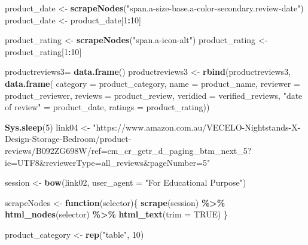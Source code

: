\documentclass[
]{article}
\newenvironment{Shaded}{\begin{snugshade}}{\end{snugshade}}
\newcommand{\AttributeTok}[1]{\textcolor[rgb]{0.13,0.29,0.53}{#1}}
\newcommand{\ConstantTok}[1]{\textcolor[rgb]{0.56,0.35,0.01}{#1}}
\newcommand{\ControlFlowTok}[1]{\textcolor[rgb]{0.13,0.29,0.53}{\textbf{#1}}}
\newcommand{\DecValTok}[1]{\textcolor[rgb]{0.00,0.00,0.81}{#1}}
\newcommand{\FunctionTok}[1]{\textcolor[rgb]{0.13,0.29,0.53}{\textbf{#1}}}
\newcommand{\NormalTok}[1]{#1}
\newcommand{\OtherTok}[1]{\textcolor[rgb]{0.56,0.35,0.01}{#1}}
\newcommand{\SpecialCharTok}[1]{\textcolor[rgb]{0.81,0.36,0.00}{\textbf{#1}}}
\newcommand{\StringTok}[1]{\textcolor[rgb]{0.31,0.60,0.02}{#1}}
\begin{document}
\begin{Shaded}
\begin{Highlighting}[]
\NormalTok{  product\_date }\OtherTok{\textless{}{-}} \FunctionTok{scrapeNodes}\NormalTok{(}\StringTok{"span.a{-}size{-}base.a{-}color{-}secondary.review{-}date"}\NormalTok{)}
\NormalTok{  product\_date }\OtherTok{\textless{}{-}}\NormalTok{ product\_date[}\DecValTok{1}\SpecialCharTok{:}\DecValTok{10}\NormalTok{]}
  
\NormalTok{  product\_rating }\OtherTok{\textless{}{-}} \FunctionTok{scrapeNodes}\NormalTok{(}\StringTok{"span.a{-}icon{-}alt"}\NormalTok{)}
\NormalTok{  product\_rating }\OtherTok{\textless{}{-}}\NormalTok{ product\_rating[}\DecValTok{1}\SpecialCharTok{:}\DecValTok{10}\NormalTok{]}
  
\NormalTok{  productreviews3}\OtherTok{=} \FunctionTok{data.frame}\NormalTok{()}
\NormalTok{  productreviews3 }\OtherTok{\textless{}{-}} \FunctionTok{rbind}\NormalTok{(productreviews3, }\FunctionTok{data.frame}\NormalTok{(}
                      \AttributeTok{category =}\NormalTok{ product\_category,}
                      \AttributeTok{name =}\NormalTok{ product\_name,}
                      \AttributeTok{reviewer =}\NormalTok{ product\_reviewer,}
                      \AttributeTok{reviews =}\NormalTok{ product\_review,}
                      \AttributeTok{veridied =}\NormalTok{ verified\_reviews,}
                      \StringTok{"date of review"} \OtherTok{=}\NormalTok{ product\_date,}
                      \AttributeTok{ratings =}\NormalTok{ product\_rating))}
  
   \FunctionTok{Sys.sleep}\NormalTok{(}\DecValTok{5}\NormalTok{)}
\NormalTok{link04 }\OtherTok{\textless{}{-}} \StringTok{"https://www.amazon.com.au/VECELO{-}Nightstands{-}X{-}Design{-}Storage{-}Bedroom/product{-}reviews/B092ZG698W/ref=cm\_cr\_getr\_d\_paging\_btm\_next\_5?ie=UTF8\&reviewerType=all\_reviews\&pageNumber=5"}


\NormalTok{  session }\OtherTok{\textless{}{-}} \FunctionTok{bow}\NormalTok{(link02,}
               \AttributeTok{user\_agent =} \StringTok{"For Educational Purpose"}\NormalTok{)}

\NormalTok{  scrapeNodes }\OtherTok{\textless{}{-}} \ControlFlowTok{function}\NormalTok{(selector)\{}
    \FunctionTok{scrape}\NormalTok{(session) }\SpecialCharTok{\%\textgreater{}\%}
      \FunctionTok{html\_nodes}\NormalTok{(selector) }\SpecialCharTok{\%\textgreater{}\%}
      \FunctionTok{html\_text}\NormalTok{(}\AttributeTok{trim =} \ConstantTok{TRUE}\NormalTok{)}
\NormalTok{  \}}

\NormalTok{  product\_category }\OtherTok{\textless{}{-}} \FunctionTok{rep}\NormalTok{(}\StringTok{"table"}\NormalTok{, }\DecValTok{10}\NormalTok{)}


\end{Highlighting}
\end{Shaded}
\end{document}
